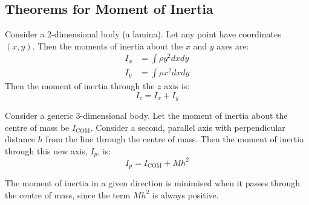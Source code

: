 \documentclass[../Main.tex]{subfiles}
\begin{document}
\subsection{Theorems for Moment of Inertia}
\begin{lemma}
    Consider a 2-dimensional body (a lamina). Let any point have coordinates $(x, y)$. Then the moments of inertia about the $x$ and $y$ axes are:
    \begin{align*}
        I_x &= \int \rho y^2 dx dy \\
        I_y &= \int \rho x^2 dx dy
    \end{align*}
    Then the moment of inertia through the $z$ axis is:
    \begin{equation}
        I_z = I_x + I_y
        \label{eqnPerpendicularAxis}
    \end{equation}
\end{lemma}
\begin{lemma}
    Consider a generic 3-dimensional body. Let the moment of inertia about the centre of mass be $I_\text{COM}$. Consider a second, parallel axis with perpendicular distance $h$ from the line through the centre of mass. Then the moment of inertia through this new axis, $I_p$, is:
    \begin{equation}
        I_p = I_\text{COM} + Mh^2
    \end{equation}
\end{lemma}
\begin{remark}
    The moment of inertia in a given direction is minimised when it passes through the centre of mass, since the term $Mh^2$ is always positive.
\end{remark}
\end{document}
